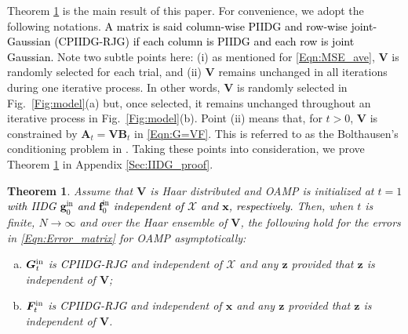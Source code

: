 \documentclass[journal]{IEEEtran}
\newcommand{\mr}{\mathrm}
\renewcommand{\bf}{\bm}
\newtheorem{theorem}{Theorem}
\newcommand{\LL}[1]{\textcolor{black}{#1}}
\newcommand{\LLC}[1]{\textcolor{black}{#1}}%
\begin{document}
Theorem \ref{THE:IIDG} is the main result of this paper. For convenience, we adopt the following notations. \LLC{A matrix is said column-wise PIIDG and row-wise joint-Gaussian (CPIIDG-RJG) if each column is PIIDG and each row is joint Gaussian.} Note two subtle points here: (i) as mentioned for \eqref{Eqn:MSE_ave}, $\bf{V}$ is randomly selected for each trial, and (ii) $\bf{V}$ remains unchanged in all iterations during one iterative process. In other words, $\bf{V}$ is randomly selected in Fig.~\ref{Fig:model}(a) but, once selected, it remains unchanged throughout an iterative process in Fig.~\ref{Fig:model}(b). Point (ii) means that, for $t>0$, $\bf{V}$ is constrained by $\bf{A}_t=\bf{VB}_t$ in \eqref{Eqn:G=VF}. {\color{black} This is referred to as the Bolthausen’s conditioning problem in \cite{Bolthausen2014, Rangan2016, Bayati2011, Takeuchi2019}.} Taking these points into consideration, we prove Theorem \ref{THE:IIDG} in Appendix \ref{Sec:IIDG_proof}. %

\begin{theorem}\label{THE:IIDG}
Assume that $\bf{V}$ is Haar distributed and OAMP is initialized at $t=1$ \LL{with  IIDG $\bf{g}^{\mr{in}}_0$ and $\bf{f}^{\mr{in}}_0 $ independent of $\bf{\mathcal{X}}$ and $\bf{x}$, respectively.} Then, when $t$ is finite, $N\to\infty$ and over the Haar ensemble of $\bf{V}$, the following hold for the errors in \eqref{Eqn:Error_matrix} for OAMP asymptotically:
\begin{enumerate}[(a)]
 \item   $\bf{G}_t^{\rm in}$ is \LLC{CPIIDG-RJG} and independent of  $\bf{\mathcal{X}}$ and any $\bf{z}$ provided that $\bf{z}$ is independent of $\bf{V}$;
 \item   $\bf{F}_t^{\rm in}$ is \LLC{CPIIDG-RJG} and independent of $\bf{x}$ and any $\bf{z}$ provided that $\bf{z}$ is independent of $\bf{V}$.
\end{enumerate} 
\end{theorem}


\end{document}
